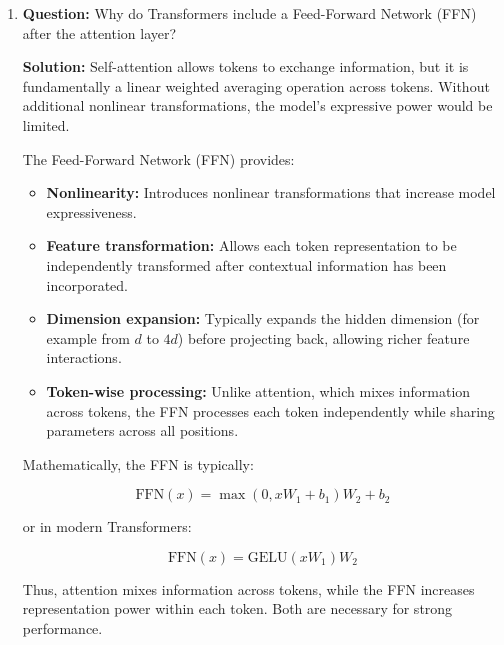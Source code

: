 \documentclass[11pt]{article}
\begin{document}
\begin{enumerate}
\textbf{Solution:}
The \texttt{[CLS]} token is a learnable embedding prepended to the sequence of patch embeddings.

Through self-attention, this token aggregates information from all patches.

Its final representation serves as a global image representation and is passed to the classification head (MLP) to produce predictions.

\item \textbf{Question:} Why do Transformers include a Feed-Forward Network (FFN) after the attention layer?

\textbf{Solution:}
Self-attention allows tokens to exchange information, but it is fundamentally a linear weighted averaging operation across tokens. Without additional nonlinear transformations, the model's expressive power would be limited.

The Feed-Forward Network (FFN) provides:

\begin{itemize}[nosep]

\item \textbf{Nonlinearity:} Introduces nonlinear transformations that increase model expressiveness.

\item \textbf{Feature transformation:} Allows each token representation to be independently transformed after contextual information has been incorporated.

\item \textbf{Dimension expansion:} Typically expands the hidden dimension (for example from $d$ to $4d$) before projecting back, allowing richer feature interactions.

\item \textbf{Token-wise processing:} Unlike attention, which mixes information across tokens, the FFN processes each token independently while sharing parameters across all positions.

\end{itemize}

Mathematically, the FFN is typically:

\[
\text{FFN}(x)
=
\max(0, xW_1 + b_1)W_2 + b_2
\]

or in modern Transformers:

\[
\text{FFN}(x)
=
\text{GELU}(xW_1)W_2
\]

Thus, attention mixes information across tokens, while the FFN increases representation power within each token. Both are necessary for strong performance.

\end{enumerate}
\end{document}
